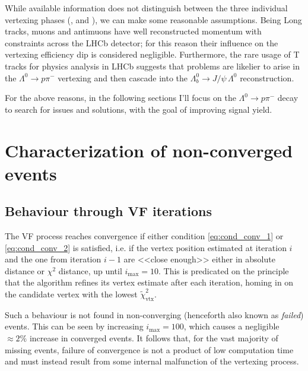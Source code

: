 While available information does not distinguish between the three individual vertexing phases (\jpsi, \lz and \lbz), we can make some reasonable assumptions.
Being Long tracks, muons and antimuons have well reconstructed momentum with constraints across the LHCb detector;
for this reason their influence on the vertexing efficiency dip is considered negligible.
Furthermore, the rare usage of T tracks for physics analysis in LHCb suggests that problems are likelier to arise in the $\Lambda^0 \rightarrow p\pi^-$ vertexing and then cascade into the $\Lambda_b^0 \rightarrow J/\psi\,\Lambda^0$ reconstruction.

For the above reasons, in the following sections I'll focus on the $\Lambda^0 \rightarrow p\pi^-$ decay to search for issues and solutions, with the goal of improving signal yield.


\section{Characterization of non-converged events}
\label{sec:characterization_non_converged}

\subsection{Behaviour through VF iterations}
\label{sec:oscillation}
The VF process reaches convergence if either condition \eqref{eq:cond_conv_1} or \eqref{eq:cond_conv_2} is satisfied, i.e. if the vertex position estimated at iteration $i$ and the one from iteration $i-1$ are <<close enough>> either in absolute distance or $\chi^2$ distance, up until $i_\text{max} = 10$.
This is predicated on the principle that the algorithm refines its vertex estimate after each iteration, homing in on the candidate vertex with the lowest $\tilde{\chi}^2_\text{vtx}$.

Such a behaviour is not found in non-converging (henceforth also known as \textit{failed}) events.
This can be seen by increasing $i_\text{max}=100$, which causes a negligible $\approx 2\%$ increase in converged events.
It follows that, for the vast majority of missing events, failure of convergence is not a product of low computation time and must instead result from some internal malfunction of the vertexing process.

